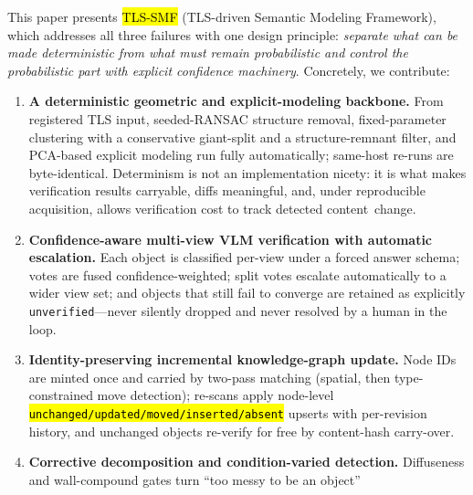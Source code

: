 \documentclass[electronics,article,accept,pdftex,moreauthors]{Definitions/mdpi}
\begin{document}
This paper presents \hl{TLS-SMF} (TLS-driven Semantic Modeling
Framework), which addresses all three failures with one design principle: \emph{separate what can be made deterministic from what must remain probabilistic and control the probabilistic part with explicit confidence machinery}. Concretely, we contribute: %


\begin{enumerate}
\item \textbf{{A deterministic geometric and explicit-modeling backbone.}}
From registered TLS input, seeded-RANSAC structure removal, fixed-parameter
clustering with a conservative giant-split and a structure-remnant filter,
and PCA-based explicit modeling run fully automatically; same-host re-runs
are byte-identical. Determinism is not an implementation nicety: it is what
makes verification results carryable, diffs meaningful, and, under
reproducible acquisition, allows verification cost to track detected
\mbox{content change}.
\item \textbf{{Confidence-aware multi-view VLM verification with automatic
escalation.}} Each object is classified per-view under a forced answer
schema; votes are fused confidence-weighted; split votes escalate
automatically to a wider view set; and objects that still fail to converge
are retained as explicitly \texttt{unverified}---never silently dropped and
never resolved by a human in the loop.
\item \textbf{Identity-preserving incremental knowledge-graph update.}
Node IDs are minted once and carried by two-pass matching (spatial, then
type-constrained move detection); re-scans apply node-level
\texttt{\hl{unchanged/updated/moved/inserted/absent}} %
 upserts with per-revision
history, and unchanged objects re-verify for free by content-hash carry-over.
\item \textbf{Corrective decomposition and condition-varied detection.}
Diffuseness and wall-compound gates turn ``too messy to be an object''

\end{enumerate}
\end{document}
